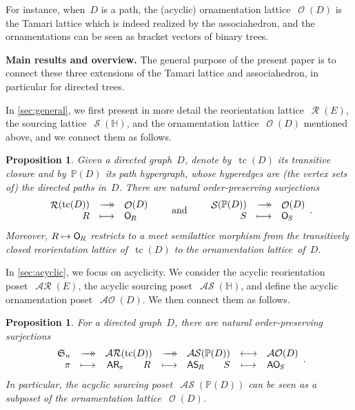 \documentclass{amsart}
\newtheorem{proposition}[theorem]{Proposition}
\theoremstyle{definition}
\renewcommand{\c}[1]{\mathcal{#1}} %
\newcommand{\surjection}{\longrightarrow\mathrel{\mkern-22mu}\rightarrow\,}
\newcommand{\bijection}{\longleftrightarrow}
\DeclareMathOperator{\tc}{tc} %
\newcommand{\para}[1]{\bigskip\noindent\textbf{#1}} %
\newcommand{\fS}{\mathfrak{S}} %
\newcommand{\mymap}[2]{\mathsf{#1}_{\hspace{-.7pt}#2}}
\DeclareMathOperator{\Orn}{\c{O}}  %
\newcommand{\orn}[1]{\mymap{O}{#1}}  %
\DeclareMathOperator{\AOrn}{\c{AO}}  %
\newcommand{\aorn}[1]{\mymap{AO}{#1}}  %
\DeclareMathOperator{\Reori}{\c{R}}  %
\DeclareMathOperator{\AReori}{\c{AR}}  %
\newcommand{\areori}[1]{\mymap{AR}{#1}}  %
\DeclareMathOperator{\Sour}{\mathcal{S}}  %
\DeclareMathOperator{\ASour}{\mathcal{AS}}  %
\newcommand{\asour}[1]{\mymap{AS}{#1}}  %
\newcommand{\HH}{\mathbb H}  %
\newcommand{\PP}{\mathbb P} %
\begin{document}
For instance, when~$D$ is a path, the (acyclic) ornamentation lattice~$\Orn(D)$ is the Tamari lattice which is indeed realized by the associahedron, and the ornamentations can be seen as bracket vectors of binary trees.


\medskip
\para{Main results and overview.}
The general purpose of the present paper is to connect these three extensions of the Tamari lattice and associahedron, in particular for directed trees.

In \cref{sec:general}, we first present in more detail the reorientation lattice~$\Reori(E)$, the sourcing lattice~$\Sour(\HH)$, and the ornamentation lattice~$\Orn(D)$ mentioned above, and we connect them as follows.

\begin{proposition}
Given a directed graph~$D$, denote by~$\tc(D)$ its transitive closure and by~$\PP(D)$ its path hypergraph, whose hyperedges are (the vertex sets of) the directed paths in~$D$.
There are natural order-preserving surjections
\[
\begin{array}{rcl}
	\Reori(\tc(D)) & \surjection & \Orn(D) \\
	R & \longmapsto & \orn{R}
\end{array}
\qquad\text{and}\qquad
\begin{array}{rcl}
	\Sour(\PP(D)) & \surjection & \Orn(D) \\
	S & \longmapsto & \orn{S}
\end{array}
.
\]
Moreover, $R \mapsto \orn{R}$ restricts to a meet semilattice morphism from the transitively closed reorientation lattice of~$\tc(D)$ to the ornamentation lattice~of~$D$.
\end{proposition}

In \cref{sec:acyclic}, we focus on acyclicity.
We consider the acyclic reorientation poset~$\AReori(E)$, the acyclic sourcing poset~$\ASour(\HH)$, and define the acyclic ornamentation poset~$\AOrn(D)$. We then connect them as follows.

\begin{proposition}
For a directed graph~$D$, there are natural order-preserving surjections
\[
\begin{array}{rcccccl}
	\fS_n & \surjection & \AReori(\tc(D)) & \surjection & \ASour(\PP(D)) & \bijection & \AOrn(D) \\
	\pi & \longmapsto & \areori{\pi} \qquad R & \longmapsto & \asour{R} \qquad S & \longmapsto & \aorn{S}
\end{array}
.
\]
In particular, the acyclic sourcing poset~$\ASour(\PP(D))$ can be seen as a subposet of the ornamentation lattice~$\Orn(D)$.
\end{proposition}
\end{document}
